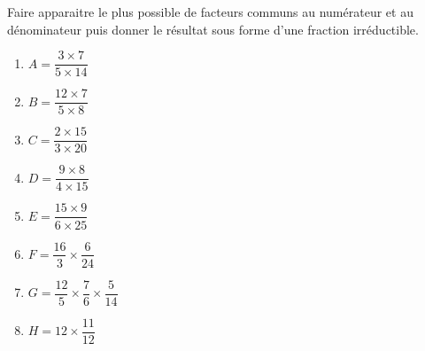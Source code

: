 \begin{exercice*}
    Faire apparaitre le plus possible de facteurs communs au numérateur et au dénominateur puis donner le résultat sous forme d'une fraction irréductible.
    \begin{multicols}{2}
        \begin{spacing}{2}
            \begin{enumerate}
                \item $A=\dfrac{3\times 7}{5\times 14}$
                \item $B=\dfrac{12\times 7}{5\times 8}$
                \item $C=\dfrac{2\times 15}{3\times 20}$
                \item $D=\dfrac{9\times 8}{4\times 15}$
                \item $E=\dfrac{15\times 9}{6\times 25}$
                \item $F=\dfrac{16}{3}\times\dfrac{6}{24}$
                \item $G=\dfrac{12}{5}\times\dfrac{7}{6}\times\dfrac{5}{14}$
                \item $H=12\times\dfrac{11}{12}$
            \end{enumerate}
        \end{spacing}
    \end{multicols}
\end{exercice*}
